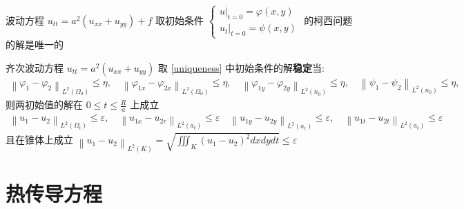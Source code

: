 \documentclass[10pt]{yerbaformat}
\begin{document}
\begin{theorem}
    波动方程 $u_{tt}=a^{2}\left(u_{xx}+u_{y y}\right)+f$ 取初始条件 $\left\{\begin{array}{l}\left.u\right|_{t=0}=\varphi(x, y) \\ \left.u_{t}\right|_{t=0}=\psi(x, y)\end{array}\right.$ 的柯西问题的解是唯一的 \label{uniqueness}
\end{theorem}

\begin{theorem}
    齐次波动方程 $u_{tt}=a^{2}\left(u_{xx}+u_{y y}\right)$ 取 \ref{uniqueness} 中初始条件的解\textbf{稳定}当:
    $$
        \begin{array}{l}
            \left\|\varphi_{1}-\varphi_{2}\right\|_{L^{2}\left(\Omega_{0}\right)} \leqslant \eta, \quad\left\|\varphi_{1 x}-\varphi_{2 x}\right\|_{L^{2}\left(\Omega_{0}\right)} \leqslant \eta, \quad
            \left\|\varphi_{1 y}-\varphi_{2 y}\right\|_{L^{2}\left(n_{0}\right)} \leqslant \eta, \quad\left\|\psi_{1}-\psi_{2}\right\|_{L^{2}\left(n_{0}\right)} \leqslant \eta,
        \end{array}
    $$
    则两初始值的解在 $0 \leqslant t \leqslant \frac{R}{a}$ 上成立
    $$
        \begin{array}{l}
            \left\|u_{1}-u_{2}\right\|_{L^{2}\left(\Omega_{t}\right)} \leqslant \varepsilon, \quad\left\|u_{1 x}-u_{2 r}\right\|_{L^{2}\left(a_{t}\right)} \leqslant \varepsilon \quad
            \left\|u_{1 y}-u_{2 y}\right\|_{L^{2}\left(a_{t}\right)} \leqslant \varepsilon, \quad\left\|u_{1 t}-u_{2 t}\right\|_{L^{2}\left(a_{t}\right)} \leqslant \varepsilon
        \end{array}
    $$
    且在锥体上成立 $\left\|u_{1}-u_{2}\right\|_{L^{2}(K)}=\sqrt{\iiint_{K}\left(u_{1}-u_{2}\right)^{2} d x d y d t} \leqslant \varepsilon$
\end{theorem}

\section{热传导方程}

\end{document}
